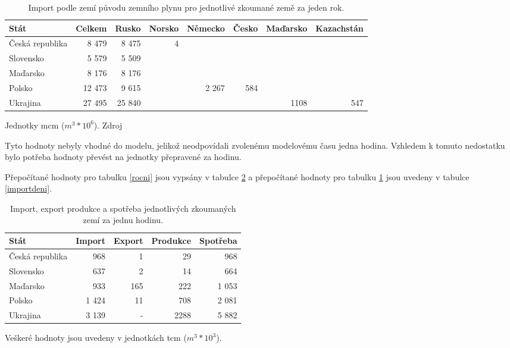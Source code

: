 \documentclass[a4paper,11pt]{article}
\begin{document}
\begin{table}[h!]
\begin{center}
\begin{tabular}{|l|r|r|r|r|r|r|r|}
    \hline
    Stát 			& Celkem		& Rusko & Norsko & Německo 	& Česko & Maďarsko & Kazachstán\\
    \hline 
    Česká republika	& 8 479		& 8 475	& 4		& 		&			&		&\\ 
    Slovensko 		& 5 579		& 5 509	& 		& 		&			&		&\\
    Maďarsko 		& 8 176		& 8 176 &		&		&			&		&\\
    Polsko 			& 12 473 	& 9 615 	& 		& 2 267	& 584		&		&\\
    Ukrajina 		& 27 495		& 25 840	& 		&		&			& 1108	& 547\\ \hline
\end{tabular}
\caption{Import podle zemí původu  zemního plynu pro jednotlivé zkoumané země za jeden rok.}
Jednotky mcm ($m^3 * 10^6$).  Zdroj \cite{IEA}
\label{importrocni}
\end{center}
\end{table}


\newpage

Tyto hodnoty nebyly vhodné do modelu, jelikož neodpovídali
zvolenému modelovému času jedna hodina. 
Vzhledem k tomuto nedostatku bylo potřeba hodnoty převést na jednotky přepravené za hodinu.

Přepočítané hodnoty pro tabulku \ref{rocni} jsou vypsány v tabulce \ref{denni}
a přepočítané hodnoty pro tabulku \ref{importrocni} jsou uvedeny v tabulce \ref{importdeni}. 

\begin{table}[h!]
\begin{center}
\begin{tabular}{|l|r|r|r|r|}
    \hline
    Stát 			& Import 	& Export & Produkce & Spotřeba \\
    \hline 
    Česká republika	& 968 		& 1 		& 29		& 968\\ 
    Slovensko 		& 637		& 2		& 14		& 664\\
    Maďarsko 		& 933		& 165	& 222	& 1 053\\
    Polsko 			& 1 424		& 11		& 708	& 2 081\\
    Ukrajina 		& 3 139	 	& -		& 2288	& 5 882 \\ \hline
\end{tabular}
\caption{Import, export produkce a spotřeba jednotlivých zkoumaných zemí za jednu hodinu.}
Veškeré hodnoty jsou uvedeny v jednotkách tcm ($m^3 * 10^3$)\footnotemark.
\label{denni}
\end{center}
\end{table}
\end{document}
